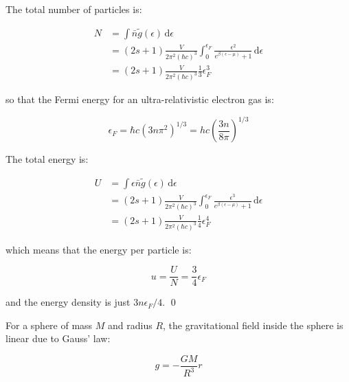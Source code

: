 \documentclass[12pt]{article}
\begin{document}
The total number of particles is:

\begin{equation}
    \begin{split}
        N &= \int \bar{n} \tilde{g}(\epsilon) \, \mathrm{d}\epsilon \\
        &= (2s + 1) \frac{V}{2\pi^{2}(\hbar c)^{3}} \int_{0}^{\epsilon_{F}} \frac{\epsilon^{2}}{e^{\beta (\epsilon - \mu)} + 1} \, \mathrm{d}\epsilon \\
        &= (2s + 1) \frac{V}{2\pi^{2}(\hbar c)^{3}} \frac{1}{3} \epsilon_{F}^{3}
    \end{split}
\end{equation}

so that the Fermi energy for an ultra-relativistic electron gas is:

\begin{equation}
    \epsilon_{F} = \hbar c (3n \pi^{2})^{1/3} = hc \left( \frac{3n}{8\pi} \right)^{1/3}
\end{equation}

The total energy is:

\begin{equation}
    \begin{split}
        U &= \int \epsilon \bar{n} \tilde{g}(\epsilon) \, \mathrm{d}\epsilon \\
        &= (2s + 1) \frac{V}{2\pi^{2}(\hbar c)^{3}} \int_{0}^{\epsilon_{F}} \frac{\epsilon^{3}}{e^{\beta (\epsilon - \mu)} + 1} \, \mathrm{d}\epsilon \\
        &= (2s + 1) \frac{V}{2\pi^{2}(\hbar c)^{3}} \frac{1}{4} \epsilon_{F}^{4}
    \end{split}
\end{equation}

which means that the energy per particle is:

\begin{equation}
    u = \frac{U}{N} = \frac{3}{4} \epsilon_{F}
\end{equation}

and the energy density is just $3n \epsilon_{F}/4$.
\qed



For a sphere of mass $M$ and radius $R$, the gravitational field inside the sphere is linear due to Gauss' law:

\begin{equation}
    g = -\frac{GM}{R^{3}} r
\end{equation}
\end{document}
